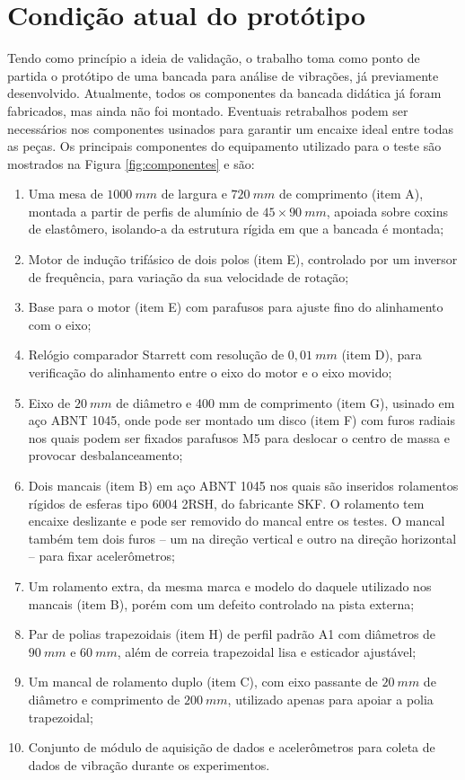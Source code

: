\documentclass[12pt,openright,oneside,a4paper,
	chapter=TITLE,section=TITLE,
	english,brazil]{abntex2}
\begin{document}
	\section{Condição atual do protótipo}
	Tendo como princípio a ideia de validação, o trabalho toma como ponto de partida o protótipo de uma bancada para análise de vibrações, já previamente desenvolvido. Atualmente, todos os componentes da bancada didática já foram fabricados, mas ainda não foi montado. Eventuais retrabalhos podem ser necessários nos componentes usinados para garantir um encaixe ideal entre todas as peças. Os principais componentes do equipamento utilizado para o teste são mostrados na Figura \ref{fig:componentes} e são:
	\begin{enumerate}
		\setlength{\itemsep}{0pt plus 2pt minus 1pt}
		\item Uma mesa de $ 1000\ mm $ de largura e $ 720\ mm $ de comprimento (item A), montada a partir de perfis de alumínio de $ 45 \times 90\ mm $, apoiada sobre coxins de elastômero, isolando-a da estrutura rígida em que a bancada é montada;
		\item Motor de indução trifásico de dois polos (item E), controlado por um inversor de frequência, para variação da sua velocidade de rotação; 
		\item Base para o motor (item E) com parafusos para ajuste fino do alinhamento com o eixo;
		\item Relógio comparador Starrett com resolução de $ 0,\!01\ mm $ (item D), para verificação do alinhamento entre o eixo do motor e o eixo movido;
		\item Eixo de $ 20\ mm $ de diâmetro e 400 mm de comprimento (item G), usinado em aço ABNT 1045, onde pode ser montado um disco (item F) com furos radiais nos quais podem ser fixados parafusos M5 para deslocar o centro de massa e provocar desbalanceamento;
		\item Dois mancais  (item B) em aço ABNT 1045 nos quais são inseridos rolamentos rígidos de esferas tipo 6004 2RSH, do fabricante SKF. O rolamento tem encaixe deslizante e pode ser removido do mancal entre os testes. O mancal também tem dois furos -- um na direção vertical e outro na direção horizontal -- para fixar acelerômetros;
		\item Um rolamento extra, da mesma marca e modelo do daquele utilizado nos mancais (item B), porém com um defeito controlado na pista externa;
		\item Par de polias trapezoidais (item H) de perfil padrão A1 com diâmetros de $ 90\ mm $ e $ 60\ mm $, além de correia trapezoidal lisa e esticador ajustável;
		\item Um mancal de rolamento duplo (item C), com eixo passante de $ 20\ mm $ de diâmetro e comprimento de $ 200\ mm $, utilizado apenas para apoiar a polia trapezoidal;
		\item Conjunto de módulo de aquisição de dados e acelerômetros para coleta de dados de vibração durante os experimentos.
	\end{enumerate}
\end{document}
